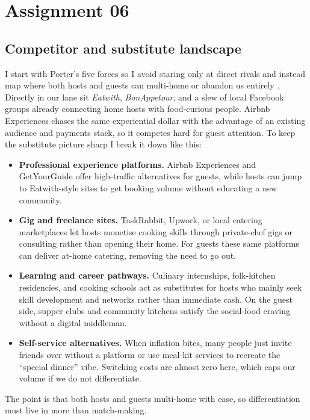 \section*{Assignment 06}

\subsection*{Competitor and substitute landscape}
I start with Porter’s five forces so I avoid staring only at direct rivals and instead map where both hosts and guests can multi-home or abandon us entirely \citep{Porter2008}. Directly in our lane sit \textit{Eatwith}, \textit{BonAppetour}, and a slew of local Facebook groups already connecting home hosts with food-curious people. Airbnb Experiences chases the same experiential dollar with the advantage of an existing audience and payments stack, so it competes hard for guest attention. To keep the substitute picture sharp I break it down like this:
\begin{itemize}
  \item \textbf{Professional experience platforms.} Airbnb Experiences and GetYourGuide offer high-traffic alternatives for guests, while hosts can jump to Eatwith-style sites to get booking volume without educating a new community.
  \item \textbf{Gig and freelance sites.} TaskRabbit, Upwork, or local catering marketplaces let hosts monetise cooking skills through private-chef gigs or consulting rather than opening their home. For guests these same platforms can deliver at-home catering, removing the need to go out.
  \item \textbf{Learning and career pathways.} Culinary internships, folk-kitchen residencies, and cooking schools act as substitutes for hosts who mainly seek skill development and networks rather than immediate cash. On the guest side, supper clubs and community kitchens satisfy the social-food craving without a digital middleman.
  \item \textbf{Self-service alternatives.} When inflation bites, many people just invite friends over without a platform or use meal-kit services to recreate the ``special dinner'' vibe. Switching costs are almost zero here, which caps our volume if we do not differentiate.
\end{itemize}
The point is that both hosts and guests multi-home with ease, so differentiation must live in more than match-making.

